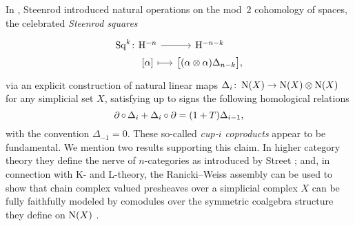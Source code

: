 In \cite{steenrod1947products}, Steenrod introduced natural operations on the mod~2 cohomology of spaces, the celebrated \textit{Steenrod squares}
\[
\begin{tikzcd} [column sep=small, row sep=0]
	\Sq^k \colon &[-20] \rH^{-n} \arrow[r] & \rH^{-n-k} \\ &
	{[\alpha]} \arrow[r, mapsto] & \big[ (\alpha \ot \alpha) \Delta_{n-k} \big],
\end{tikzcd}
\]
via an explicit construction of natural linear maps $\Delta_i \colon \operatorname{N}(X) \to \operatorname{N}(X) \otimes \operatorname{N}(X)$ for any simplicial set $X$, satisfying up to signs the following homological relations
\begin{equation} \label{e:cupi homological relations}
\operatorname{\partial} \circ \, \Delta_i + \Delta_i \circ \operatorname{\partial} =
(1 + T) \Delta_{i-1},
\end{equation}
with the convention $\Delta_{-1} = 0$.
These so-called \textit{cup-$i$ coproducts} appear to be fundamental.
We mention two results supporting this claim.
In higher category theory they define the nerve of $n$-categories \cite{medina2020globular} as introduced by Street \cite{street1987orientals}; and, in connection with K- and L-theory, the Ranicki--Weiss assembly \cite{ranicki1990assembly} can be used to show that chain complex valued presheaves over a simplicial complex $X$ can be fully faithfully modeled by comodules over the symmetric coalgebra structure they define on $\operatorname{N}(X)$ \cite{medina2022assembly}.

